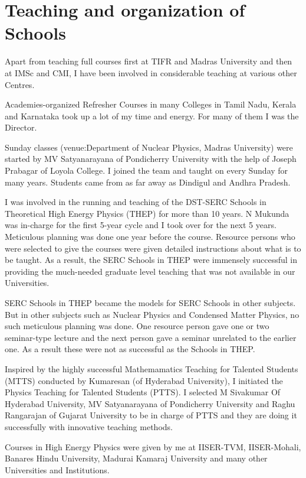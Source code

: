 \section*{Teaching and organization of Schools}

\vspace{-.3cm}

Apart from teaching full courses first at TIFR and Madras
University and then at IMSc and CMI, I have been involved in
considerable teaching at various other Centres.

Academies-organized Refresher Courses in many Colleges in
Tamil Nadu, Kerala and Karnataka took up a lot of my time and
energy. For many of them I was the Director.

Sunday classes (venue:Department of Nuclear Physics, Madras
University) were started by MV Satyanarayana of Pondicherry
University with the help of Joseph Prabagar of Loyola College.
I joined the team and taught on every Sunday for many years.
Students came from as far away as Dindigul and Andhra Pradesh.

I was involved in the running and teaching of the DST-SERC
Schools in Theoretical High Energy Physics (THEP) for more
than 10 years. N Mukunda was in-charge for the first 5-year
cycle and I took over for the next 5 years.
Meticulous planning  was done one year before the course.
Resource persons who were selected to give the courses were given
detailed instructions about what is to be taught. As a result, the
SERC Schools in THEP were immensely successful in providing the
much-needed graduate level teaching that was not available in our
Universities.

SERC Schools in THEP became the models for SERC Schools in other
subjects. But in other subjects such as Nuclear Physics and
Condensed Matter Physics, no such meticulous planning was done.
One resource person gave one or two seminar-type lecture and the
next person gave a seminar unrelated to the earlier one. As a result
these were not as successful as the Schools in THEP.

Inspired by the highly successful Mathemamatics Teaching for
Talented Students (MTTS) conducted by Kumaresan (of Hyderabad
University), I initiated the Physics Teaching for Talented Students
(PTTS). I selected M Sivakumar Of Hyderabad University, MV Satyanarayana of
Pondicherry University and Raghu Rangarajan of Gujarat University to be in
charge of PTTS and they are doing it successfully with innovative
teaching methods.

Courses in High Energy Physics were given by me at IISER-TVM, IISER-Mohali,
Banares Hindu University, Madurai Kamaraj University and many other
Universities and Institutions.


